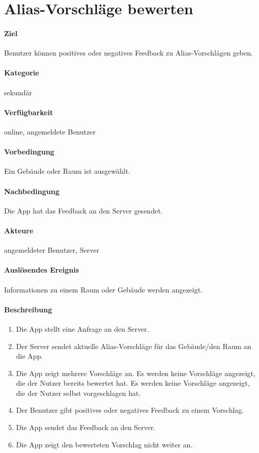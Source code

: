 \section{Alias-Vorschläge bewerten}
\label{Aliasbewertungsfunktion}
\paragraph{Ziel}
Benutzer können positives oder negatives Feedback zu Alias-Vorschlägen geben.
\paragraph{Kategorie}
sekundär
\paragraph{Verfügbarkeit}
online, angemeldete Benutzer
\paragraph{Vorbedingung}
Ein Gebäude oder Raum ist ausgewählt.
\paragraph{Nachbedingung}
Die App hat das Feedback an den Server gesendet.
\paragraph{Akteure}
angemeldeter Benutzer, Server
\paragraph{Auslösendes Ereignis}
Informationen zu einem Raum oder Gebäude werden angezeigt.
\paragraph{Beschreibung}
\begin{enumerate}
    \item Die App stellt eine Anfrage an den Server.
    \item Der Server sendet aktuelle Alias-Vorschläge für das Gebäude/den Raum an die App.
    \item Die App zeigt mehrere Vorschläge an. Es werden keine Vorschläge angezeigt, die der Nutzer bereits bewertet hat. Es werden keine Vorschläge angezeigt, die der Nutzer selbst vorgeschlagen hat.
    \item Der Benutzer gibt positives oder negatives Feedback zu einem Vorschlag.
    \item Die App sendet das Feedback an den Server.
    \item Die App zeigt den bewerteten Vorschlag nicht weiter an.
\end{enumerate}